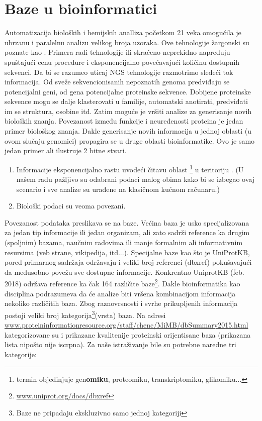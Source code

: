 \chapter{Baze u bioinformatici} %

\label{Baze} %


Automatizacija bioloških i hemijskih analliza početkom 21 veka omogućila je
ubrzanu i paralelnu analizu velikog broja uzoraka. Ove tehnologije žargonski su
poznate kao  . Primera radi tehnologije 
 ili skraćeno  neprekidno napreduju
spuštajući cenu procedure i eksponencijalno povećavajući količinu dostupnih
sekvenci. Da bi se razumeo uticaj NGS tehnologije razmotrimo sledeći tok
informacija.  Od sveže sekvencionisanih nepoznatih genoma predviđaju se
potencijalni geni, od gena potencijalne proteinske sekvence.  Dobijene
proteinske sekvence mogu se dalje klasterovati u familije, automatski
anotirati, predviđati im se struktura, osobine itd.  Zatim moguće je vršiti
analize za generisanje novih bioloških znanja. Povezanost između funkcije i
neuređenosti proteina je jedan primer biološkog znanja. Dakle generisanje novih
informacija u jednoj oblasti (u ovom slučaju genomici) propagira se u druge
oblasti bioinformatike. Ovo je samo jedan primer ali ilustruje 2 bitne stvari.
\begin{enumerate}
  \item Informacije eksponencijalno rastu uvodeći čitavu oblast
    \footnote{termin objedinjuje gen\textbf{omiku}, proteomiku,
    transkriptomiku, glikomiku...}   u teritoriju \parencite{Chen2017}. (U našem radu pažljivo su odabrani podaci malog
  obima kako bi se izbegao ovaj scenario i sve analize su urađene na klasičnom
  kućnom računaru.)
  \item Biološki podaci su veoma povezani.
\end{enumerate}

Povezanost podataka preslikava se na baze. Većina baza je usko specijalizovana
za jedan tip informacije ili jedan organizam, ali zato sadrži reference ka
drugim (spoljnim) bazama, naučnim radovima ili  manje formalnim ali
informativnim resursima (veb strane, vikipedija, itd...). Specijalne baze kao
što je UniProtKB, pored primarnog sadržaja održavaju i veliki broj referenci
(dbxref) pokušavajući da međusobno povežu sve dostupne informacije. Konkrentno
UniprotKB (feb. 2018) održava reference ka čak 164 različite
baze\footnote{\url{www.uniprot.org/docs/dbxref}}.  Dakle bioinformatika kao
disciplina podrazumeva da će analize biti vršena kombinacijom informacija
nekoliko različitih baza.  Zbog raznovrsnosti i svrhe prikupljenih informacija
postoji veliki broj kategorija\footnote{Baze ne pripadaju ekskluzivno samo
jednoj kategoriji}(vrsta) baza.  Na adresi
\url{www.proteininformationresource.org/staff/chenc/MiMB/dbSummary2015.html}
kategorizovane su i prikazane kvalitenije proteinski orijentisane baza
(prikazana lista nipošto nije iscrpna)\parencite{Chen2017}. Za naše
istraživanje bile su potrebne naredne tri kategorije:

